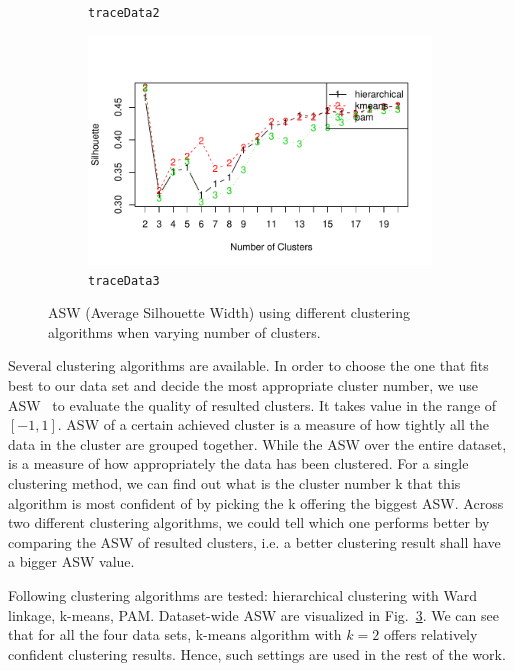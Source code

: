 \begin{figure}[!htb]
\begin{subfigure}[b]{.7\textwidth}
	\caption{\scriptsize \texttt{traceData2}}
	\label{fig:traceSil2}
	\end{subfigure}
	\begin{subfigure}[b]{.7\textwidth}
	\centering
	\includegraphics[width=\textwidth]{gfx/chap3/traceSil3.pdf}
	\caption{\scriptsize \texttt{traceData3}}
	\label{fig:traceSil3}
	\end{subfigure}
\caption{ASW (Average Silhouette Width) using different clustering algorithms when varying number of clusters.}
\label{fig:sil}
\end{figure}

Several clustering algorithms are available. 
In order to choose the one that fits best to our data set and decide the most appropriate cluster number, we use \acf{ASW}~\cite{Rousseeuw1987} to evaluate the quality of resulted clusters. 
It takes value in the range of $[-1,1]$. 
\ac{ASW} of a certain achieved cluster is a measure of how tightly all the data in the cluster are grouped together. 
While the \ac{ASW} over the entire dataset, is a measure of how appropriately the data has been clustered. For a single clustering method, we can find out what is the cluster number k that this algorithm is most confident of by picking the k offering the biggest \ac{ASW}. Across two different clustering algorithms, we could tell which one performs better by comparing the \ac{ASW} of resulted clusters, i.e. a better clustering result shall have a bigger \ac{ASW} value.

Following clustering algorithms are tested: hierarchical clustering with Ward linkage, k-means, \ac{PAM}.
Dataset-wide \ac{ASW} are visualized in Fig.~\ref{fig:sil}. We can see that for all the four data sets, k-means algorithm with $k=2$ offers relatively confident clustering results. 
Hence, such settings are used in the rest of the work.


